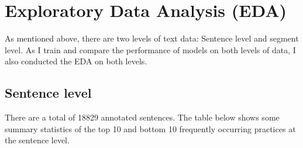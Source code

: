 
\chapter{Exploratory Data Analysis (EDA)} %

\label{Chapter4} %

As mentioned above, there are two levels of text data: Sentence level and segment level. As I train and compare the performance of models on both levels of data, I also conducted the EDA on both levels.


\section{Sentence level}

There are a total of 18829 annotated sentences. The table below shows some summary statistics of the top 10 and bottom 10 frequently occurring practices at the sentence level. 

